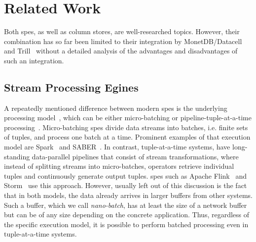 \section{Related Work}
\label{sec:related-work}

Both \acp{spe}, as well as column stores, are well-researched topics.
However, their combination has so far been limited to their integration by MonetDB/Datacell~\cite{DBLP:journals/pvldb/LiarouIMK12} and Trill~\cite{DBLP:journals/pvldb/ChandramouliGBDPTW14} without a detailed analysis of the advantages and disadvantages of such an integration.

\subsection{Stream Processing Egines}

A repeatedly mentioned difference between modern \acp{spe} is the underlying processing model~\cite{DBLP:journals/pvldb/ZeuchBRMKLRTM19}, which can be either micro-batching or pipeline-tuple-at-a-time processing~\cite{DBLP:journals/pvldb/AkidauBCCFLMMPS15,DBLP:conf/cloud/BattreEHKMW10,DBLP:conf/pldi/ChambersRPAHBW10,DBLP:conf/osdi/DeanG04,DBLP:conf/nsdi/ZahariaCDDMMFSS12}.
Micro-batching \acp{spe} divide data streams into batches, i.e. finite sets of tuples, and process one batch at a time.
Prominent examples of that execution model are Spark~\cite{DBLP:journals/cacm/ZahariaXWDADMRV16} and SABER~\cite{DBLP:conf/sigmod/KoliousisWFWCP16}.
In contrast, tuple-at-a-time systems, have long-standing data-parallel pipelines that consist of stream transformations, where instead of splitting streams into micro-batches, operators retrieve individual tuples and continuously generate output tuples.
\acp{spe} such as Apache Flink~\cite{DBLP:journals/cacm/ZahariaXWDADMRV16} and Storm~\cite{DBLP:conf/sigmod/ToshniwalTSRPKJGFDBMR14} use this approach.
However, usually left out of this discussion is the fact that in both models, the data already arrives in larger buffers from other systems.
Such a buffer, which we call \emph{nano-batch}, has at least the size of a network buffer but can be of any size depending on the concrete application.
Thus, regardless of the specific execution model, it is possible to perform batched processing even in tuple-at-a-time systems.

